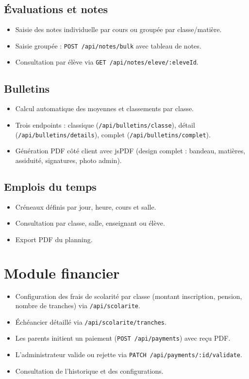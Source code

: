 \documentclass[12pt,a4paper]{report}
\begin{document}
\subsection*{Évaluations et notes}
\begin{itemize}[leftmargin=*]
    \item Saisie des notes individuelle par cours ou groupée par classe/matière.
    \item Saisie groupée : \texttt{POST /api/notes/bulk} avec tableau de notes.
    \item Consultation par élève via \texttt{GET /api/notes/eleve/:eleveId}.
\end{itemize}
 
\subsection*{Bulletins}
\begin{itemize}[leftmargin=*]
    \item Calcul automatique des moyennes et classements par classe.
    \item Trois endpoints : classique (\texttt{/api/bulletins/classe}), détail (\texttt{/api/bulletins/details}), complet (\texttt{/api/bulletins/complet}).
    \item Génération PDF côté client avec jsPDF (design complet : bandeau, matières, assiduité, signatures, photo admin).
\end{itemize}
 
\subsection*{Emplois du temps}
\begin{itemize}[leftmargin=*]
    \item Créneaux définis par jour, heure, cours et salle.
    \item Consultation par classe, salle, enseignant ou élève.
    \item Export PDF du planning.
\end{itemize}
 
\section{Module financier}
\begin{itemize}[leftmargin=*]
    \item Configuration des frais de scolarité par classe (montant inscription, pension, nombre de tranches) via \texttt{/api/scolarite}.
    \item Échéancier détaillé via \texttt{/api/scolarite/tranches}.
    \item Les parents initient un paiement (\texttt{POST /api/payments}) avec reçu PDF.
    \item L'administrateur valide ou rejette via \texttt{PATCH /api/payments/:id/validate}.
    \item Consultation de l'historique et des configurations.
\end{itemize}
 
\end{document}
